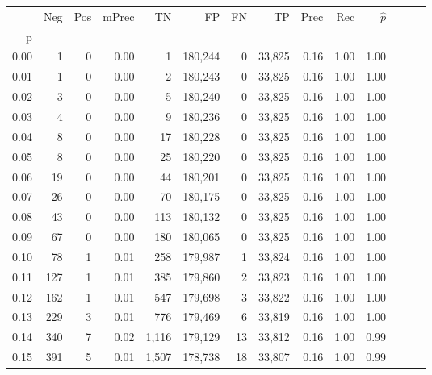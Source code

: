 \begin{tabular}{rrrrrrrrrrrrrr}
\toprule
{} &    Neg &    Pos & mPrec &       TN &       FP &      FN &      TP &  Prec &   Rec & $\hat{p}$ \\
p    &        &        &       &          &          &         &         &       &       &           \\
\midrule
0.00 &      1 &      0 &  0.00 &        1 &  180,244 &       0 &  33,825 &  0.16 &  1.00 &      1.00 \\
0.01 &      1 &      0 &  0.00 &        2 &  180,243 &       0 &  33,825 &  0.16 &  1.00 &      1.00 \\
0.02 &      3 &      0 &  0.00 &        5 &  180,240 &       0 &  33,825 &  0.16 &  1.00 &      1.00 \\
0.03 &      4 &      0 &  0.00 &        9 &  180,236 &       0 &  33,825 &  0.16 &  1.00 &      1.00 \\
0.04 &      8 &      0 &  0.00 &       17 &  180,228 &       0 &  33,825 &  0.16 &  1.00 &      1.00 \\
0.05 &      8 &      0 &  0.00 &       25 &  180,220 &       0 &  33,825 &  0.16 &  1.00 &      1.00 \\
0.06 &     19 &      0 &  0.00 &       44 &  180,201 &       0 &  33,825 &  0.16 &  1.00 &      1.00 \\
0.07 &     26 &      0 &  0.00 &       70 &  180,175 &       0 &  33,825 &  0.16 &  1.00 &      1.00 \\
0.08 &     43 &      0 &  0.00 &      113 &  180,132 &       0 &  33,825 &  0.16 &  1.00 &      1.00 \\
0.09 &     67 &      0 &  0.00 &      180 &  180,065 &       0 &  33,825 &  0.16 &  1.00 &      1.00 \\
0.10 &     78 &      1 &  0.01 &      258 &  179,987 &       1 &  33,824 &  0.16 &  1.00 &      1.00 \\
0.11 &    127 &      1 &  0.01 &      385 &  179,860 &       2 &  33,823 &  0.16 &  1.00 &      1.00 \\
0.12 &    162 &      1 &  0.01 &      547 &  179,698 &       3 &  33,822 &  0.16 &  1.00 &      1.00 \\
0.13 &    229 &      3 &  0.01 &      776 &  179,469 &       6 &  33,819 &  0.16 &  1.00 &      1.00 \\
0.14 &    340 &      7 &  0.02 &    1,116 &  179,129 &      13 &  33,812 &  0.16 &  1.00 &      0.99 \\
0.15 &    391 &      5 &  0.01 &    1,507 &  178,738 &      18 &  33,807 &  0.16 &  1.00 &      0.99 \\

\end{tabular}
